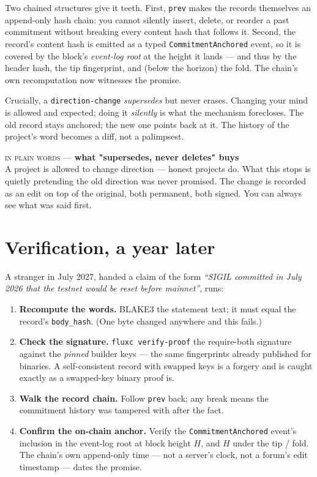 \documentclass[10pt,a4paper]{article}
\newcommand{\layman}[3]{%
\begin{tcolorbox}[enhanced,
  interior style={left color=#1!9,right color=white},
  colframe=#1!45!slate,boxrule=0.5pt,arc=3pt,
  borderline west={2.5pt}{0pt}{#1},
  left=9pt,right=9pt,top=7pt,bottom=7pt]
{\scriptsize\textcolor{#1}{\textsc{in plain words}}\; — \;\textbf{\small #2}}\\[3pt]
\small #3
\end{tcolorbox}}
\begin{document}
Two chained structures give it teeth. First, \texttt{prev} makes the records
themselves an append-only hash chain: you cannot silently insert, delete, or reorder a
past commitment without breaking every content hash that follows it. Second, the
record's content hash is emitted as a typed \texttt{CommitmentAnchored} event, so it is
covered by the block's \emph{event-log root} at the height it lands --- and thus by the
header hash, the tip fingerprint, and (below the horizon) the fold. The chain's own
recomputation now witnesses the promise.

Crucially, a \texttt{direction-change} \emph{supersedes} but never erases. Changing
your mind is allowed and expected; doing it \emph{silently} is what the mechanism
forecloses. The old record stays anchored; the new one points back at it. The history
of the project's word becomes a diff, not a palimpsest.

\layman{sigilviolet}{what "supersedes, never deletes" buys}{A project is allowed to
change direction --- honest projects do. What this stops is quietly pretending the old
direction was never promised. The change is recorded as an edit on top of the original,
both permanent, both signed. You can always see what was said first.}

\section{Verification, a year later}
A stranger in July 2027, handed a claim of the form \emph{``SIGIL committed in July
2026 that the testnet would be reset before mainnet''}, runs:

\begin{enumerate}[leftmargin=1.4em,itemsep=2pt]
\item \textbf{Recompute the words.} BLAKE3 the statement text; it must equal the
  record's \texttt{body\_hash}. (One byte changed anywhere and this fails.)
\item \textbf{Check the signature.} \texttt{fluxc verify-proof} the require-both
  signature against the \emph{pinned} builder keys --- the same fingerprints already
  published for binaries. A self-consistent record with swapped keys is a forgery and
  is caught exactly as a swapped-key binary proof is.
\item \textbf{Walk the record chain.} Follow \texttt{prev} back; any break means the
  commitment history was tampered with after the fact.
\item \textbf{Confirm the on-chain anchor.} Verify the \texttt{CommitmentAnchored}
  event's inclusion in the event-log root at block height $H$, and $H$ under the tip /
  fold. The chain's own append-only time --- not a server's clock, not a forum's edit
  timestamp --- dates the promise.
\end{enumerate}
\end{document}
